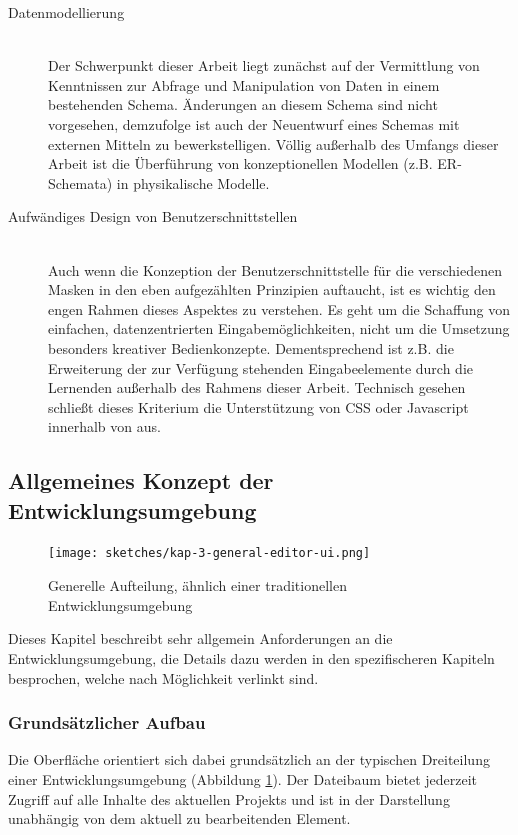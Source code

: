 \begin{description}
\item[Datenmodellierung] \hfill \\
  Der Schwerpunkt dieser Arbeit liegt zunächst auf der Vermittlung von Kenntnissen zur Abfrage und Manipulation von Daten in einem bestehenden Schema. Änderungen an diesem Schema sind nicht vorgesehen, demzufolge ist auch der Neuentwurf eines Schemas mit externen Mitteln zu bewerkstelligen. Völlig außerhalb des Umfangs dieser Arbeit ist die Überführung von konzeptionellen Modellen (z.B. ER-Schemata) in physikalische Modelle.
\item[Aufwändiges Design von Benutzerschnittstellen] \hfill \\
  Auch wenn die Konzeption der Benutzerschnittstelle für die verschiedenen Masken in den eben aufgezählten Prinzipien auftaucht, ist es wichtig den engen Rahmen dieses Aspektes zu verstehen. Es geht um die Schaffung von einfachen, datenzentrierten Eingabemöglichkeiten, nicht um die Umsetzung besonders kreativer Bedienkonzepte. Dementsprechend ist z.B. die Erweiterung der zur Verfügung stehenden Eingabeelemente durch die Lernenden außerhalb des Rahmens dieser Arbeit. Technisch gesehen schließt dieses Kriterium die Unterstützung von CSS oder Javascript innerhalb von \idename aus.
\end{description}

\subsection{Allgemeines Konzept der Entwicklungsumgebung}
\label{sec:design-general-concept}

\begin{figure}
  \centering \texttt{[image: sketches/kap-3-general-editor-ui.png]}
  \caption{Generelle Aufteilung, ähnlich einer traditionellen Entwicklungsumgebung}
  \label{fig:ui-sketch-general}
\end{figure}

Dieses Kapitel beschreibt sehr allgemein Anforderungen an die Entwicklungsumgebung, die Details dazu werden in den spezifischeren Kapiteln besprochen, welche nach Möglichkeit verlinkt sind.

\subsubsection{Grundsätzlicher Aufbau}

Die Oberfläche orientiert sich dabei grundsätzlich an der typischen Dreiteilung einer Entwicklungsumgebung (Abbildung \ref{fig:ui-sketch-general}). Der Dateibaum bietet jederzeit Zugriff auf alle Inhalte des aktuellen Projekts und ist in der Darstellung unabhängig von dem aktuell zu bearbeitenden Element.

